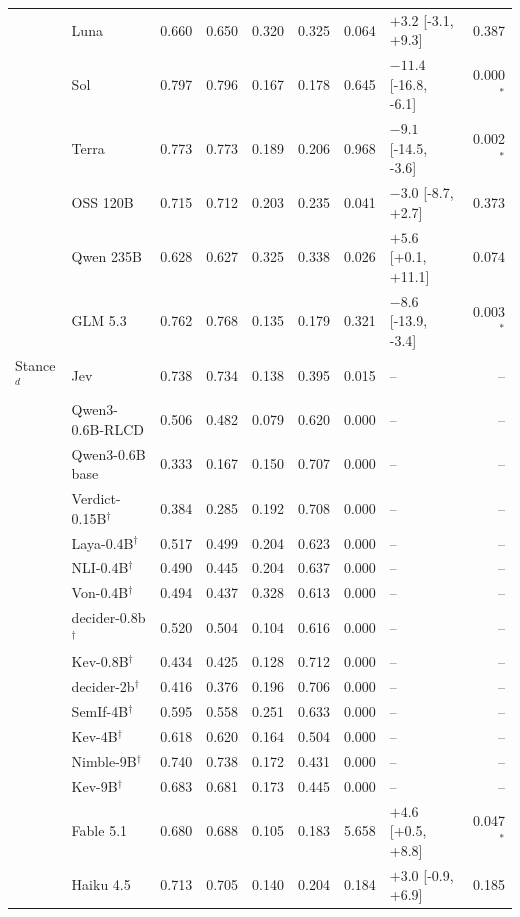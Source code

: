 \begin{longtable}{llrrrrrlr}
 & Luna & 0.660 & 0.650 & 0.320 & 0.325 & 0.064 & $+3.2$ [-3.1, +9.3] & 0.387 \\
 & Sol & 0.797 & 0.796 & 0.167 & 0.178 & 0.645 & $-11.4$ [-16.8, -6.1] & 0.000$^{*}$ \\
 & Terra & 0.773 & 0.773 & 0.189 & 0.206 & 0.968 & $-9.1$ [-14.5, -3.6] & 0.002$^{*}$ \\
 & OSS 120B & 0.715 & 0.712 & 0.203 & 0.235 & 0.041 & $-3.0$ [-8.7, +2.7] & 0.373 \\
 & Qwen 235B & 0.628 & 0.627 & 0.325 & 0.338 & 0.026 & $+5.6$ [+0.1, +11.1] & 0.074 \\
 & GLM 5.3 & 0.762 & 0.768 & 0.135 & 0.179 & 0.321 & $-8.6$ [-13.9, -3.4] & 0.003$^{*}$ \\
\midrule
Stance$^{d}$ & Jev & 0.738 & 0.734 & 0.138 & 0.395 & 0.015 & -- & -- \\
 & Qwen3-0.6B-RLCD & 0.506 & 0.482 & 0.079 & 0.620 & 0.000 & -- & -- \\
 & Qwen3-0.6B base & 0.333 & 0.167 & 0.150 & 0.707 & 0.000 & -- & -- \\
 & Verdict-0.15B$^{\dagger}$ & 0.384 & 0.285 & 0.192 & 0.708 & 0.000 & -- & -- \\
 & Laya-0.4B$^{\dagger}$ & 0.517 & 0.499 & 0.204 & 0.623 & 0.000 & -- & -- \\
 & NLI-0.4B$^{\dagger}$ & 0.490 & 0.445 & 0.204 & 0.637 & 0.000 & -- & -- \\
 & Von-0.4B$^{\dagger}$ & 0.494 & 0.437 & 0.328 & 0.613 & 0.000 & -- & -- \\
 & decider-0.8b$^{\dagger}$ & 0.520 & 0.504 & 0.104 & 0.616 & 0.000 & -- & -- \\
 & Kev-0.8B$^{\dagger}$ & 0.434 & 0.425 & 0.128 & 0.712 & 0.000 & -- & -- \\
 & decider-2b$^{\dagger}$ & 0.416 & 0.376 & 0.196 & 0.706 & 0.000 & -- & -- \\
 & SemIf-4B$^{\dagger}$ & 0.595 & 0.558 & 0.251 & 0.633 & 0.000 & -- & -- \\
 & Kev-4B$^{\dagger}$ & 0.618 & 0.620 & 0.164 & 0.504 & 0.000 & -- & -- \\
 & Nimble-9B$^{\dagger}$ & 0.740 & 0.738 & 0.172 & 0.431 & 0.000 & -- & -- \\
 & Kev-9B$^{\dagger}$ & 0.683 & 0.681 & 0.173 & 0.445 & 0.000 & -- & -- \\
 & Fable 5.1 & 0.680 & 0.688 & 0.105 & 0.183 & 5.658 & $+4.6$ [+0.5, +8.8] & 0.047$^{*}$ \\
 & Haiku 4.5 & 0.713 & 0.705 & 0.140 & 0.204 & 0.184 & $+3.0$ [-0.9, +6.9] & 0.185 \\

\end{longtable}
